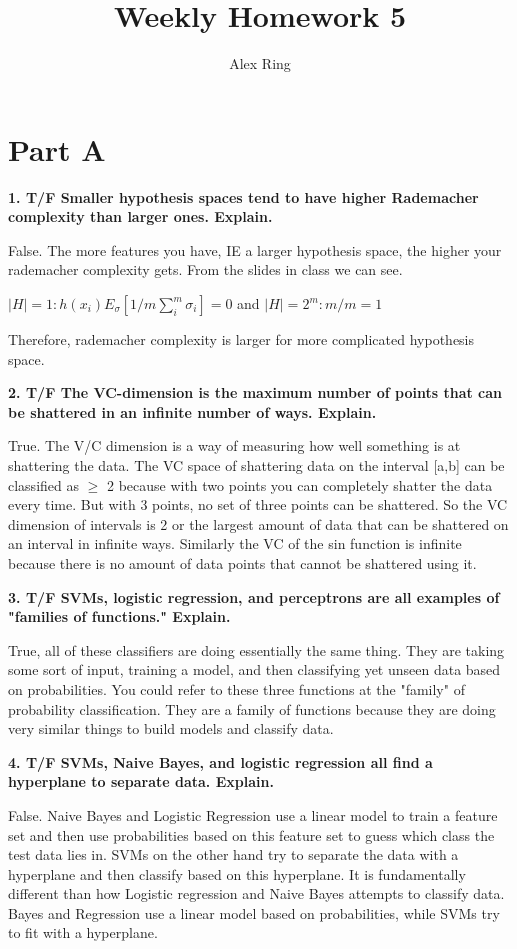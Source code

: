 \documentclass[11pt, oneside]{article}   	%
\title{Weekly Homework 5}
\author{Alex Ring}
\begin{document}
\maketitle
\section*{Part A}

\textbf{1. T/F Smaller hypothesis spaces tend to have higher Rademacher complexity than larger ones. Explain. }

False. The more features you have, IE a larger hypothesis space, the higher your rademacher complexity gets.  From the slides in class we can see. 

$|H| = 1 : h(x_i)E_\sigma [1/m \sum_{i}^{m}\sigma_i] = 0$  and $|H| = 2^m : m/m = 1$ 

Therefore, rademacher complexity is larger for more complicated hypothesis space. 

\textbf{2. T/F The VC-dimension is the maximum number of points that can be shattered in an infinite number of ways. Explain.}

True. The V/C dimension is a way of measuring how well something is at shattering the data. The VC space of shattering data on the interval [a,b] can be classified as $\geq$ 2 because with two points you can completely shatter the data every time. But with 3 points, no set of three points can be shattered. So the VC dimension of intervals is 2 or the largest amount of data that can be shattered on an interval in infinite ways. Similarly the VC of the sin function is infinite because there is no amount of data points that cannot be shattered using it. 

\textbf{3. T/F SVMs, logistic regression, and perceptrons are all examples of "families of functions." Explain.}

True, all of these classifiers are doing essentially the same thing. They are taking some sort of input, training a model, and then classifying yet unseen data based on probabilities. You could refer to these three functions at the "family" of probability classification. They are a family of functions because they are doing very similar things to build models and classify data. 

\textbf{4. T/F SVMs, Naive Bayes, and logistic regression all find a hyperplane to separate data. Explain.}

False. Naive Bayes and Logistic Regression use a linear model to train a feature set and then use probabilities based on this feature set to guess which class the test data lies in. SVMs on the other hand try to separate the data with a hyperplane and then classify based on this hyperplane. It is fundamentally different than how Logistic regression and Naive Bayes attempts to classify data. Bayes and Regression use a linear model based on probabilities, while SVMs try to fit with a hyperplane. 
\end{document}
